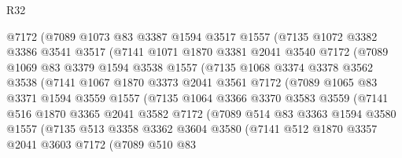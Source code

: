 \begin{lexlean}{R32}
\begin{coremodule}
            @7172
            (@7089
              @1073
              @83
              @3387
              @1594
              @3517
              @1557
              (@7135
                @1072
                @3382
                @3386
                @3541
                @3517
                (@7141
                  @1071
                  @1870
                  @3381
                  @2041
                  @3540
                  @7172
                  (@7089
                    @1069
                    @83
                    @3379
                    @1594
                    @3538
                    @1557
                    (@7135
                      @1068
                      @3374
                      @3378
                      @3562
                      @3538
                      (@7141
                        @1067
                        @1870
                        @3373
                        @2041
                        @3561
                        @7172
                        (@7089
                          @1065
                          @83
                          @3371
                          @1594
                          @3559
                          @1557
                          (@7135
                            @1064
                            @3366
                            @3370
                            @3583
                            @3559
                            (@7141
                              @516
                              @1870
                              @3365
                              @2041
                              @3582
                              @7172
                              (@7089
                                @514
                                @83
                                @3363
                                @1594
                                @3580
                                @1557
                                (@7135
                                  @513
                                  @3358
                                  @3362
                                  @3604
                                  @3580
                                  (@7141
                                    @512
                                    @1870
                                    @3357
                                    @2041
                                    @3603
                                    @7172
                                    (@7089
                                      @510
                                      @83

\end{coremodule}
\end{lexlean}
